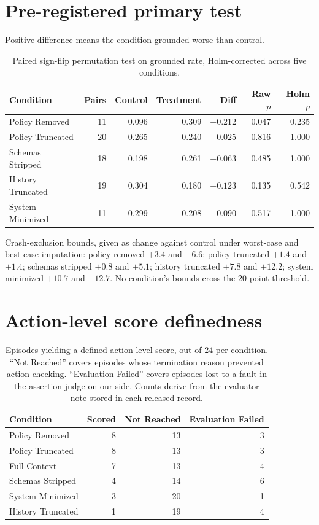 \documentclass{article}
\begin{document}
\FloatBarrier
\section{Pre-registered primary test}
\label{app:primary}

Positive difference means the condition grounded worse than control.

\begin{table}[!ht]
\centering
\small
\caption{Paired sign-flip permutation test on grounded rate, Holm-corrected across five
conditions.}
\begin{tabular}{lrrrrrr}
\toprule
Condition & Pairs & Control & Treatment & Diff & Raw $p$ & Holm $p$ \\
\midrule
Policy Removed & 11 & 0.096 & 0.309 & $-0.212$ & 0.047 & 0.235 \\
Policy Truncated & 20 & 0.265 & 0.240 & $+0.025$ & 0.816 & 1.000 \\
Schemas Stripped & 18 & 0.198 & 0.261 & $-0.063$ & 0.485 & 1.000 \\
History Truncated & 19 & 0.304 & 0.180 & $+0.123$ & 0.135 & 0.542 \\
System Minimized & 11 & 0.299 & 0.208 & $+0.090$ & 0.517 & 1.000 \\
\bottomrule
\end{tabular}
\end{table}

Crash-exclusion bounds, given as change against control under worst-case and best-case
imputation: policy removed $+3.4$ and $-6.6$; policy truncated $+1.4$ and $+1.4$;
schemas stripped $+0.8$ and $+5.1$; history truncated $+7.8$ and $+12.2$; system
minimized $+10.7$ and $-12.7$. No condition's bounds cross the 20-point threshold.

\section{Action-level score definedness}
\label{app:acc}

\begin{table}[!ht]
\centering
\small
\caption{Episodes yielding a defined action-level score, out of 24 per condition.
``Not Reached'' covers episodes whose termination reason prevented action checking.
``Evaluation Failed'' covers episodes lost to a fault in the assertion judge on our
side. Counts derive from the evaluator note stored in each released record.}
\begin{tabular}{lrrr}
\toprule
Condition & Scored & Not Reached & Evaluation Failed \\
\midrule
Policy Removed & 8 & 13 & 3 \\
Policy Truncated & 8 & 13 & 3 \\
Full Context & 7 & 13 & 4 \\
Schemas Stripped & 4 & 14 & 6 \\
System Minimized & 3 & 20 & 1 \\
History Truncated & 1 & 19 & 4 \\
\bottomrule
\end{tabular}
\end{table}
\end{document}
